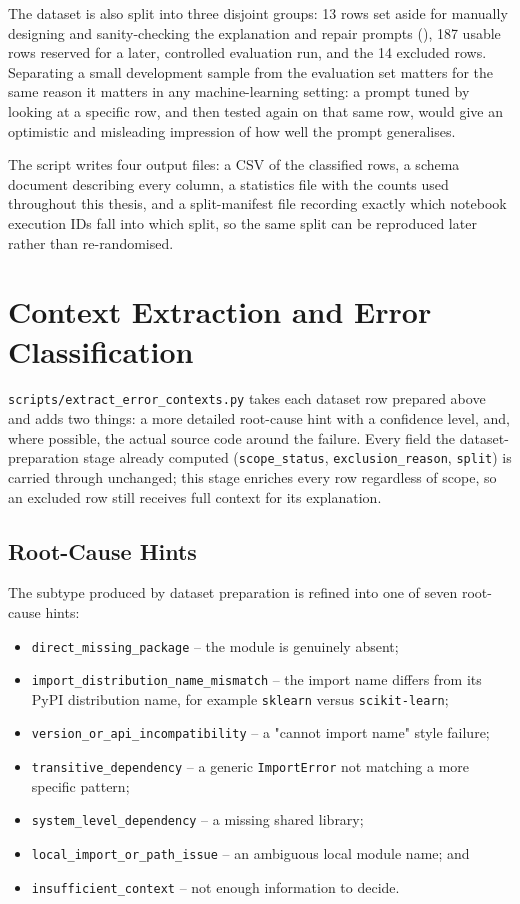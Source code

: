 The dataset is also split into three disjoint groups: 13 rows set aside for
manually designing and sanity-checking the explanation and repair prompts
(), 187 usable rows reserved for a
later, controlled evaluation run, and the 14 excluded rows. Separating a
small development sample from the evaluation set matters for the same
reason it matters in any machine-learning setting: a prompt tuned by looking
at a specific row, and then tested again on that same row, would give an
optimistic and misleading impression of how well the prompt generalises.

The script writes four output files: a CSV of the classified rows, a schema
document describing every column, a statistics file with the counts used
throughout this thesis, and a split-manifest file recording exactly which
notebook execution IDs fall into which split, so the same split can be
reproduced later rather than re-randomised.

\section{Context Extraction and Error Classification}
\label{sec:m-classification}

\texttt{scripts/extract\_error\_contexts.py} takes each dataset row prepared
above and adds two things: a more detailed root-cause hint with a confidence
level, and, where possible, the actual source code around the failure. Every
field the dataset-preparation stage already computed
(\texttt{scope\_status}, \texttt{exclusion\_reason}, \texttt{split}) is
carried through unchanged; this stage enriches every row regardless of
scope, so an excluded row still receives full context for its explanation.

\subsection{Root-Cause Hints}

The subtype produced by dataset preparation is refined into one of seven
root-cause hints:

\begin{itemize}
  \item \texttt{direct\_missing\_package} -- the module is genuinely absent;
  \item \texttt{import\_distribution\_name\_mismatch} -- the import name
        differs from its PyPI distribution name, for example
        \texttt{sklearn} versus \texttt{scikit-learn};
  \item \texttt{version\_or\_api\_incompatibility} -- a "cannot import name"
        style failure;
  \item \texttt{transitive\_dependency} -- a generic \texttt{ImportError}
        not matching a more specific pattern;
  \item \texttt{system\_level\_dependency} -- a missing shared library;
  \item \texttt{local\_import\_or\_path\_issue} -- an ambiguous local module
        name; and
  \item \texttt{insufficient\_context} -- not enough information to decide.
\end{itemize}

